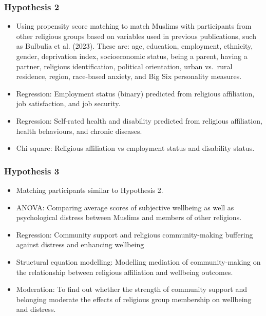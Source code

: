 \documentclass[
]{interact}
\providecommand{\tightlist}{%
  \setlength{\itemsep}{0pt}\setlength{\parskip}{0pt}}\usepackage{longtable,booktabs,array}
\begin{document}
\subsubsection{Hypothesis 2}\label{hypothesis-2}

\begin{itemize}
\tightlist
\item
  Using propensity score matching to match Muslims with participants
  from other religious groups based on variables used in previous
  publications, such as Bulbulia et al. (2023). These are: age,
  education, employment, ethnicity, gender, deprivation index,
  socioeconomic status, being a parent, having a partner, religious
  identification, political orientation, urban vs.~rural residence,
  region, race-based anxiety, and Big Six personality measures.
\item
  Regression: Employment status (binary) predicted from religious
  affiliation, job satisfaction, and job security.
\item
  Regression: Self-rated health and disability predicted from religious
  affiliation, health behaviours, and chronic diseases.
\item
  Chi square: Religious affiliation vs employment status and disability
  status.
\end{itemize}

\subsubsection{Hypothesis 3}\label{hypothesis-3}

\begin{itemize}
\tightlist
\item
  Matching participants similar to Hypothesis 2.
\item
  ANOVA: Comparing average scores of subjective wellbeing as well as
  psychological distress between Muslims and members of other religions.
\item
  Regression: Community support and religious community-making buffering
  against distress and enhancing wellbeing
\item
  Structural equation modelling: Modelling mediation of community-making
  on the relationship between religious affiliation and wellbeing
  outcomes.
\item
  Moderation: To find out whether the strength of community support and
  belonging moderate the effects of religious group membership on
  wellbeing and distress.
\end{itemize}
\end{document}
